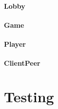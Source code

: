 \documentclass[12pt, letterpaper]{article}
\begin{document}
    \paragraph{Lobby}

    \paragraph{Game}

    \paragraph{Player}

    \paragraph{ClientPeer}


    \section{Testing}
    \label{sec:testing}




\end{document}

